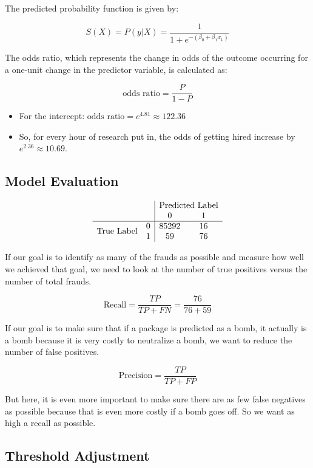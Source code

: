 \documentclass{article}
\theoremstyle{definition}
\theoremstyle{theorem}
\theoremstyle{theorem}
\theoremstyle{theorem}
\theoremstyle{theorem}
\theoremstyle{definition}
\theoremstyle{definition}
\theoremstyle{definition}
\theoremstyle{definition}
\theoremstyle{definition}
\begin{document}
The predicted probability function is given by:

\[
S(X) = P(y | X) = \frac{1}{1 + e^{-(\beta_0 + \beta_1 x_1)}}
\]

The odds ratio, which represents the change in odds of the outcome occurring for a one-unit change in the predictor variable, is calculated as:

\[
\text{odds ratio} = \frac{P}{1-P}
\]

\begin{itemize}
    \item For the intercept: \(\text{odds ratio} = e^{4.81} \approx 122.36\)
    \item So, for every hour of research put in, the odds of getting hired increase by \(e^{2.36} \approx 10.69\).
\end{itemize}


\subsection{Model Evaluation}

\[
\begin{array}{cc|cc}
    & & \multicolumn{2}{c}{\text{Predicted Label}} \\
    & & 0 & 1 \\
    \hline
    \multirow{2}{*}{\text{True Label}} & 0 & 85292 & 16 \\
    & 1 & 59 & 76 \\
\end{array}
\]

If our goal is to identify as many of the frauds as possible and measure how well we achieved that goal, we need to look at the number of true positives versus the number of total frauds.

\[
\text{Recall} = \frac{TP}{TP + FN} = \frac{76}{76 + 59}
\]

If our goal is to make sure that if a package is predicted as a bomb, it actually is a bomb because it is very costly to neutralize a bomb, we want to reduce the number of false positives.

\[
\text{Precision} = \frac{TP}{TP + FP}
\]

But here, it is even more important to make sure there are as few false negatives as possible because that is even more costly if a bomb goes off. So we want as high a recall as possible.

\subsection{Threshold Adjustment}
\end{document}
